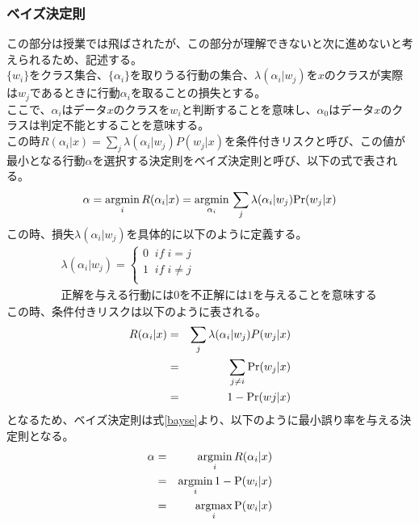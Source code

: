 \documentclass[dvipdfmx,titlepage, a4paper]{jsarticle}%
\begin{document}
\subsubsection{ベイズ決定則}
この部分は授業では飛ばされたが、この部分が理解できないと次に進めないと考えられるため、記述する。\\
$\{w_{i}\}$をクラス集合、$\{\alpha_{i}\}$を取りうる行動の集合、$\lambda(\alpha_{i}|w_{j})$を$x$のクラスが実際は$w_{j}$であるときに行動$\alpha_{i}$を取ることの損失とする。\\
ここで、$\alpha_{i}$はデータ$x$のクラスを$w_{i}$と判断することを意味し、$\alpha_{0}$はデータ$x$のクラスは判定不能とすることを意味する。\\
この時$R(\alpha_{i}|x) = \sum_{j}\lambda(\alpha_{i}|w_{j})P(w_{j}|x)$を条件付きリスクと呼び、この値が最小となる行動$\alpha$を選択する決定則をベイズ決定則と呼び、以下の式で表される。
\begin{equation}
	\alpha = \underset{i}{{\rm argmin}}\, R(\alpha_{i} | x) = \underset{\alpha_{i}}{{\rm argmin}}\, \sum_{j}\lambda(\alpha_{i}|w_{j}){\rm Pr}(w_{j}|x)\label{bayse}
\end{equation}
この時、損失$\lambda(\alpha_{i}|w_{j})$を具体的に以下のように定義する。
\begin{eqnarray*}
	&&\lambda(\alpha_{i}|w_{j}) = 
	\left\{
		\begin{array}{c}
			0 \; \;if\; i = j\\
		1\;\; if \; i \neq j\\
	\end{array}
	\right.\\
	&&\mbox{正解を与える行動には0を不正解には1を与えることを意味する}
\end{eqnarray*}
この時、条件付きリスクは以下のように表される。
\begin{eqnarray*}
	R(\alpha_{i}|x) &=& \sum_{j}\lambda(\alpha_{i}|w_{j})P(w_{j}|x)\\
	&=& \sum_{j \neq i}{\rm Pr}(w_{j}|x)\\
	&=& 1 - {\rm Pr}(w{j}|x)
\end{eqnarray*}
となるため、ベイズ決定則は式\eqref{bayse}より、以下のように最小誤り率を与える決定則となる。
\begin{eqnarray}
	\alpha &=& \underset{i}{{\rm argmin}}\, R(\alpha_{i} | x) \nonumber\\
	&=& \underset{i}{{\rm argmin}}\, 1 - {\rm P}(w_{i}|x) \nonumber\\
	&=& \underset{i}{{\rm argmax}}\, {\rm P}(w_{i}|x) \label{max:bayse}
\end{eqnarray}
\end{document}

